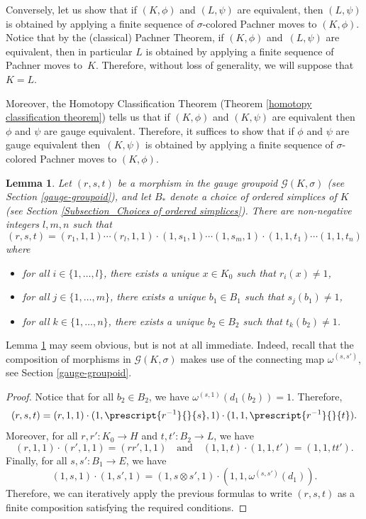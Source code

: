 \documentclass[a4paper, oneside]{amsart}
\numberwithin{equation}{subsection}
\theoremstyle{referencedlemma}
\theoremstyle{plain} %
\newtheorem{lem}[equation]{Lemma}
\theoremstyle{remark}
\begin{document}
Conversely, let us show that if $(K, \phi)$ and $(L, \psi)$ are equivalent, then $(L,\psi)$ is obtained by applying a finite sequence of $\sigma$-colored Pachner moves to $(K,\phi)$. Notice that by the (classical) Pachner Theorem,  if $(K,\phi)$ and~$(L,\psi)$ are equivalent, then in particular $L$ is obtained by applying a finite sequence of Pachner moves to~$K$. Therefore, without loss of generality, we will suppose that $K = L$.  

Moreover,  the Homotopy Classification Theorem (Theorem \ref{homotopy classification theorem}) tells us that if $(K, \phi)$ and $(K, \psi)$ are equivalent then~$\phi$ and $\psi$ are gauge equivalent.  Therefore, it suffices to show that if $\phi$ and $\psi$ are gauge equivalent then~$(K, \psi)$ is obtained by applying a finite sequence of $\sigma$-colored Pachner moves to $(K, \phi)$.  

\begin{lem}\label{Lemma gauge-groupoid generators}
Let $(r,s,t)$ be a morphism in the gauge groupoid $\mathcal{G}(K,\sigma)$ (see Section \ref{gauge-groupoid}), and let $B_*$ denote a choice of ordered simplices of $K$ (see Section \ref{Subsection_Choices of ordered simplices}). There are non-negative integers $l, m, n$ such that 
$$
(r,s,t) = (r_1,1,1)\cdots (r_l, 1, 1)\cdot  (1, s_1, 1)\cdots (1, s_m, 1)\cdot (1,1,t_1)\cdots (1,1,t_n)
$$
where 
\begin{itemize}
\item for all $i\in \{1, \ldots,  l\}$,  there exists a unique $x\in K_0$ such that $r_i(x) \neq 1$, 
\item for all $j\in \{1, \ldots, m\}$, there exists a unique $b_1 \in B_1$ such that $s_j(b_1) \neq 1$,
\item for all $k\in \{1, \ldots, n\}$,  there exists a unique $b_2\in B_2$ such that $t_k(b_2)\neq 1$.
\end{itemize}
\end{lem}

Lemma \ref{Lemma gauge-groupoid generators} may seem obvious, but is not at all immediate.  Indeed, recall that the composition of morphisms in $\mathcal{G}(K,\sigma)$ makes use of the connecting map $\omega^{(s,s')}$, see Section \ref{gauge-groupoid}.

\begin{proof}
Notice that for all $b_2\in B_2$,  we have $\omega^{(s,1)}(d_1(b_2)) = 1$. Therefore,
$$
(r,s,t) = (r,1,1)\cdot (1, \prescript{r^{-1}}{}{s}, 1)\cdot (1, 1, \prescript{r^{-1}}{}{t}).
$$
Moreover, for all $r, r' \colon K_0 \to H$ and $t, t'\colon B_2\to L$, we have
$$
(r, 1, 1)\cdot (r', 1, 1) = (r r', 1, 1)\quad \text{and}\quad (1,1,t) \cdot (1,1,t') = (1, 1, t t').
$$
Finally, for all $s,s'\colon B_1\to E$, we have
$$
(1,s,1)\cdot (1,s', 1) = (1, s\otimes s', 1)\cdot (1,1,\omega^{(s,s')}(d_1)).
$$
Therefore, we can iteratively apply the previous formulas to write $(r,s,t)$ as a finite composition satisfying the required conditions. 
\end{proof}
\end{document}
